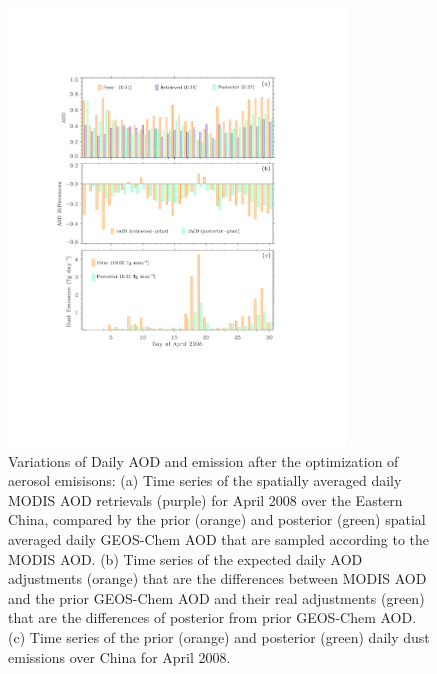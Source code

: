  \begin{figure}[p]
  \centering
  \includegraphics[width={0.8\textwidth}]{figures/a4.pdf}
  \caption[Variations of Daily AOD and emissions after the
optimization of aerosol emisisons.]{Variations of Daily AOD and
emission after the optimization of aerosol emisisons: (a) Time series 
of the spatially averaged daily MODIS AOD
retrievals (purple) for April 2008 over the Eastern China, compared by
the prior (orange) and posterior (green) spatial averaged daily
GEOS-Chem AOD that are sampled according to the MODIS AOD. (b)
Time series of the expected daily AOD adjustments (orange) that are the
differences between MODIS AOD and the prior GEOS-Chem AOD and their real
adjustments (green) that are the differences of posterior from prior
GEOS-Chem AOD. (c) Time series of the prior (orange) and posterior
(green) daily dust emissions over China for April 2008. \citep[Figure
adopted from][]{Xu13}}
  \label{fig:dailyaod}
 \end{figure}

